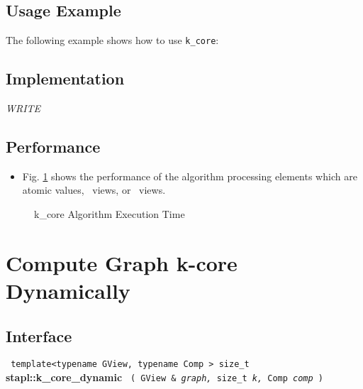\subsection{Usage Example} \label{sec-k-core-alg-use}

The following example shows how to use 
\texttt{k\_core}:


\subsection{Implementation} \label{sec-k-core-alg-impl}

\textit{WRITE}

\subsection{Performance} \label{sec-k-core-alg-perf}

\begin{itemize}
\item
Fig. \ref{fig:k-core-alg-exec-exper}
shows the performance of the algorithm processing
elements which are atomic values, \stl\ views, or \stapl\ views.
\end{itemize}

\begin{figure}[p]
\caption{ k\_core Algorithm Execution Time}
\label{fig:k-core-alg-exec-exper}
\end{figure}


\section{ Compute Graph k-core Dynamically}
\label{sec-k-core-dyn-alg}

\subsection{Interface} \label{sec-k-core-dyn-alg-inter}

\noindent
\texttt{%
template<typename GView, typename Comp >
\newline
size\_t 
}
\newline
\textbf{stapl::k\_core\_dynamic}%
\newline
\texttt{%
(
GView \&
\textit{graph,}%
size\_t
\textit{k,}%
Comp
\textit{comp}%
)     
}
\vspace{0.4cm}

